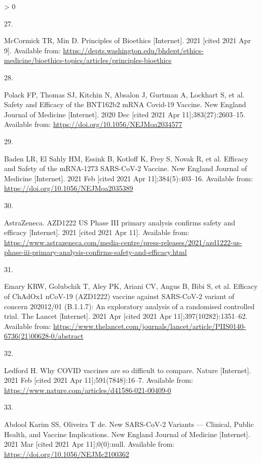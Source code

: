 \documentclass[]{elsarticle} %
\newlength{\csllabelwidth}
\newlength{\cslhangindent}
\newenvironment{CSLReferences}[3] %
 {%
  \setlength{\parindent}{0pt}
  \ifodd #1 \everypar{\setlength{\hangindent}{\cslhangindent}}\ignorespaces\fi
  \ifnum #2 > 0
  \setlength{\parskip}{#2\baselineskip}
  \fi
 }%
 {}
\newcommand{\CSLLeftMargin}[1]{\parbox[t]{\csllabelwidth}{#1}}
\newcommand{\CSLRightInline}[1]{\parbox[t]{\linewidth - \csllabelwidth}{#1}}
\begin{document}
\begin{CSLReferences}{0}{0}
\leavevmode\hypertarget{ref-mccormick_principles_2021}{}%
\CSLLeftMargin{27. }
\CSLRightInline{McCormick TR, Min D. Principles of {Bioethics}
{[}Internet{]}. 2021 {[}cited 2021 Apr 9{]}. Available from:
\url{https://depts.washington.edu/bhdept/ethics-medicine/bioethics-topics/articles/principles-bioethics}}

\leavevmode\hypertarget{ref-polack_safety_2020}{}%
\CSLLeftMargin{28. }
\CSLRightInline{Polack FP, Thomas SJ, Kitchin N, Absalon J, Gurtman A,
Lockhart S, et al. Safety and {Efficacy} of the {BNT162b2} {mRNA}
{Covid}-19 {Vaccine}. New England Journal of Medicine {[}Internet{]}.
2020 Dec {[}cited 2021 Apr 11{]};383(27):2603--15. Available from:
\url{https://doi.org/10.1056/NEJMoa2034577}}

\leavevmode\hypertarget{ref-baden_efficacy_2021}{}%
\CSLLeftMargin{29. }
\CSLRightInline{Baden LR, El Sahly HM, Essink B, Kotloff K, Frey S,
Novak R, et al. Efficacy and {Safety} of the {mRNA}-1273 {SARS}-{CoV}-2
{Vaccine}. New England Journal of Medicine {[}Internet{]}. 2021 Feb
{[}cited 2021 Apr 11{]};384(5):403--16. Available from:
\url{https://doi.org/10.1056/NEJMoa2035389}}

\leavevmode\hypertarget{ref-astrazeneca_azd1222_2021}{}%
\CSLLeftMargin{30. }
\CSLRightInline{AstraZeneca. {AZD1222} {US} {Phase} {III} primary
analysis confirms safety and efficacy {[}Internet{]}. 2021 {[}cited 2021
Apr 11{]}. Available from:
\url{https://www.astrazeneca.com/media-centre/press-releases/2021/azd1222-us-phase-iii-primary-analysis-confirms-safety-and-efficacy.html}}

\leavevmode\hypertarget{ref-emary_efficacy_2021}{}%
\CSLLeftMargin{31. }
\CSLRightInline{Emary KRW, Golubchik T, Aley PK, Ariani CV, Angus B,
Bibi S, et al. Efficacy of {ChAdOx1} {nCoV}-19 ({AZD1222}) vaccine
against {SARS}-{CoV}-2 variant of concern 202012/01 ({B}.1.1.7): An
exploratory analysis of a randomised controlled trial. The Lancet
{[}Internet{]}. 2021 Apr {[}cited 2021 Apr 11{]};397(10282):1351--62.
Available from:
\url{https://www.thelancet.com/journals/lancet/article/PIIS0140-6736(21)00628-0/abstract}}

\leavevmode\hypertarget{ref-ledford_why_2021}{}%
\CSLLeftMargin{32. }
\CSLRightInline{Ledford H. Why {COVID} vaccines are so difficult to
compare. Nature {[}Internet{]}. 2021 Feb {[}cited 2021 Apr
11{]};591(7848):16--7. Available from:
\url{https://www.nature.com/articles/d41586-021-00409-0}}

\leavevmode\hypertarget{ref-abdool_karim_new_2021}{}%
\CSLLeftMargin{33. }
\CSLRightInline{Abdool Karim SS, Oliveira T de. New {SARS}-{CoV}-2
{Variants} --- {Clinical}, {Public} {Health}, and {Vaccine}
{Implications}. New England Journal of Medicine {[}Internet{]}. 2021 Mar
{[}cited 2021 Apr 11{]};0(0):null. Available from:
\url{https://doi.org/10.1056/NEJMc2100362}}


\end{CSLReferences}
\end{document}
